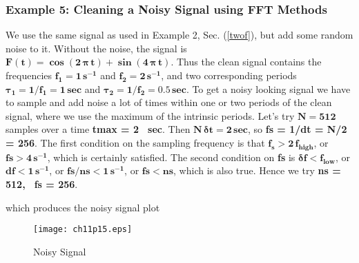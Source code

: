 \documentclass[11pt]{article}
\begin{document}
\subsubsection{Example 5: Cleaning a Noisy Signal using FFT Methods}
We use the same signal as used in Example 2, Sec. (\ref{twof}), but
  add some random noise to it.
Without the noise, the signal is 
  $\mathbf{F(t) = \boldsymbol{\cos(2\,\pi \,t)} + \boldsymbol{\sin(4\,\pi \,t)}}$.
Thus the clean signal contains the frequencies 
 $\mathbf{f_{1} = 1\, s^{-1} }$ and $\mathbf{f_{2} = 2\, s^{-1} }$,
  and two corresponding periods 
  $\mathbf{\boldsymbol{\tau}_{1} = 1/f_{1} = 1 \, sec}$ and
  $\mathbf{\boldsymbol{\tau}_{2} = 1/f_{2} = 0.5 \, sec}$.
To get a noisy looking signal we have to sample and add noise
  a lot of times within one or two periods of the
  clean signal, where we use the maximum of the intrinsic periods.
Let's try $\mathbf{N = 512}$ samples over a time \textbf{tmax = 2 \, sec}.
Then $\mathbf{N\,\boldsymbol{\delta}t = 2 \, sec}$, so \textbf{fs = 1/dt = N/2 = 256}.
The first condition on the sampling frequency is that $\mathbf{f_{s} > 2\, f_{high}}$,
  or $\mathbf{fs > 4 \, s^{-1}}$, which is certainly satisfied.
The second condition on \textbf{fs} is $\mathbf{\boldsymbol{\delta}f < f_{low}}$,
  or $\mathbf{df < 1 \, s^{-1}}$, or $\mathbf{fs/ns < 1 \, s^{-1}}$, or $\mathbf{fs < ns}$, which is also
  true.
Hence we try \textbf{ns = 512, \, fs = 256}. 
which produces the noisy signal plot
\smallskip
\begin{figure} [h]  
   \centerline{\texttt{[image: ch11p15.eps]} }
	\caption{Noisy Signal}
\end{figure} 

%
\newpage
\end{document}
